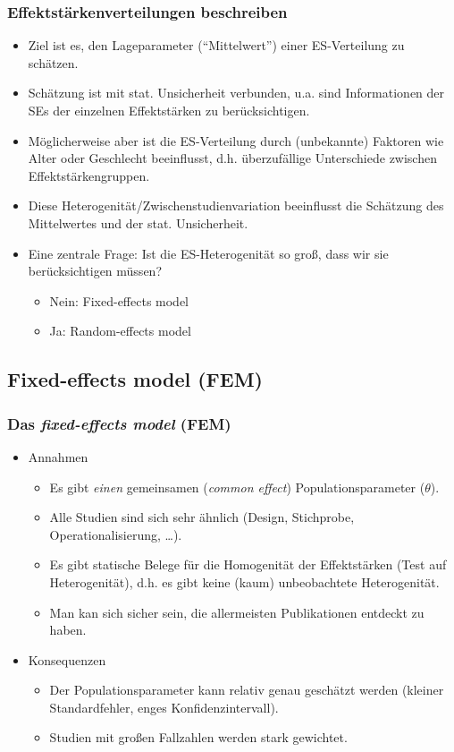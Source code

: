 \begin{frame}
  \frametitle{Effektstärkenverteilungen beschreiben}
  \begin{itemize}
  \item Ziel ist es, den Lageparameter ("`Mittelwert"') einer ES-Verteilung zu schätzen.
  \item Schätzung ist mit stat. Unsicherheit verbunden, u.a. sind Informationen der
    SEs der einzelnen Effektstärken zu berücksichtigen.
  \item Möglicherweise aber ist die ES-Verteilung durch (unbekannte) Faktoren wie Alter
    oder Geschlecht beeinflusst, d.h. überzufällige Unterschiede zwischen
    Effektstärkengruppen.
  \item Diese Heterogenität/Zwischenstudienvariation beeinflusst die Schätzung
    des Mittelwertes und der stat. Unsicherheit.
  \item Eine zentrale Frage: Ist die ES-Heterogenität so groß, dass wir sie
    berücksichtigen müssen?
    \begin{itemize}
    \item Nein: Fixed-effects model
    \item Ja: Random-effects model
    \end{itemize}
  \end{itemize}
\end{frame}






\subsection{Fixed-effects model (FEM)}

\begin{frame}
  \frametitle{Das \emph{fixed-effects model} (FEM)}
  \begin{itemize}
  \item Annahmen
    \begin{itemize}
    \item Es gibt \emph{einen} gemeinsamen (\emph{common effect})
      Populationsparameter ($\theta$).
    \item Alle Studien sind sich sehr ähnlich (Design, Stichprobe, Operationalisierung, \ldots).
    \item Es gibt statische Belege für die Homogenität der Effektstärken (Test
      auf Heterogenität), d.h. es gibt keine (kaum) unbeobachtete Heterogenität.
    \item Man kan sich sicher sein, die allermeisten Publikationen entdeckt zu
      haben.
    \end{itemize}
  \item Konsequenzen
    \begin{itemize}
    \item Der Populationsparameter kann relativ genau geschätzt werden (kleiner
      Standardfehler, enges Konfidenzintervall).
    \item Studien mit großen Fallzahlen werden stark gewichtet.
    \end{itemize}
  \end{itemize}
\end{frame}



